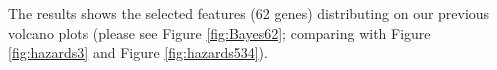 \documentclass[preprint,12pt]{elsarticle}
\newenvironment{MyColorPar}[1]{%
    \leavevmode\color{#1}\ignorespaces%
}{%
}%
\begin{document}
\begin{MyColorPar}{blue}







The results shows the selected features (62 genes) distributing on our previous volcano plots (please see Figure \ref{fig:Bayes62}; comparing with Figure \ref{fig:hazards3} and Figure \ref{fig:hazards534}).



\end{MyColorPar}
\end{document}
